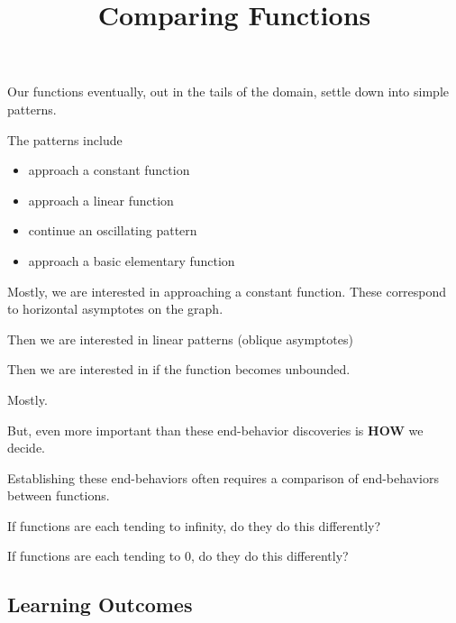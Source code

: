 \documentclass{ximera}
\title{Comparing Functions}
\begin{document}
\begin{abstract}
\end{abstract}
\maketitle







Our functions eventually, out in the tails of the domain, settle down into simple patterns.  

The patterns include

\begin{itemize}
\item approach a constant function
\item approach a linear function
\item continue an oscillating pattern
\item approach a basic elementary function 
\end{itemize}


Mostly, we are interested in approaching a constant function.  These correspond to horizontal asymptotes on the graph.

Then we are interested in linear patterns (oblique asymptotes)

Then we are interested in if the function becomes unbounded.

Mostly.


But, even more important than these end-behavior discoveries is \textbf{HOW} we decide.

Establishing these end-behaviors often requires a comparison of end-behaviors between functions.  


If functions are each tending to infinity, do they do this differently?


If functions are each tending to $0$, do they do this differently?















\subsection*{Learning Outcomes}
\end{document}
